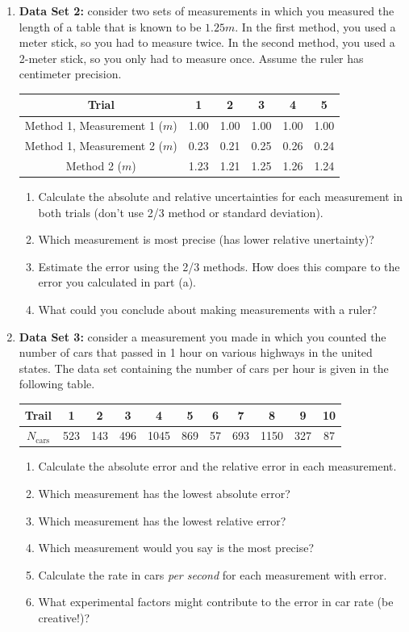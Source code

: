 \begin{enumerate}
\item {\bf{Data Set 2:}} consider two sets of measurements in which you measured the length of a table that is known to be $1.25 m$. In the first method, you used a meter stick, so you had to measure twice. In the second method, you used a 2-meter stick, so you only had to measure once. Assume the ruler has centimeter precision.
\begin{center}
\begin{tabular}{ |c | c | c | c | c | c |}
\hline
Trial &1&2&3&4&5 \\ \hline
Method 1, Measurement 1 ($m$) & 1.00 & 1.00 & 1.00 &1.00 &1.00 \\
\hline
Method 1, Measurement 2  ($m$)& 0.23 &0.21&0.25&0.26&0.24 \\
\hline
Method 2 ($m$)& 1.23&1.21&1.25&1.26&1.24 \\
\hline
\end{tabular}
\end{center}
\begin{enumerate}
\item Calculate the absolute and relative uncertainties for each measurement in both trials (don't use 2/3 method or standard deviation).
\item Which measurement is most precise (has lower relative unertainty)?
\item Estimate the error using the 2/3 methods. How does this compare to the error you calculated in part (a).
\item What could you conclude about making measurements with a ruler?
\end{enumerate}

\item {\bf{Data Set 3:}} consider a measurement you made in which you counted the number of cars that passed in 1 hour on various highways in the united states. The data set containing the number of cars per hour is given in the following table.
\begin{center}
\begin{tabular}{|c | c | c | c | c | c | c | c | c | c | c|}
\hline
Trail&1&2&3&4&5&6&7&8&9&10 \\ \hline
$N_{\text{cars}}$&523&143&496&1045&869&57&693&1150&327&87 \\
\hline
\end{tabular}
\end{center}
\begin{enumerate}
\item Calculate the absolute error and the relative error in each measurement.
\item Which measurement has the lowest absolute error?
\item Which measurement has the lowest relative error?
\item Which measurement would you say is the most precise?
\item Calculate the rate in cars {\it{per second}} for each measurement with error.
\item What experimental factors might contribute to the error in car rate (be creative!)?
\end{enumerate}
\end{enumerate}

